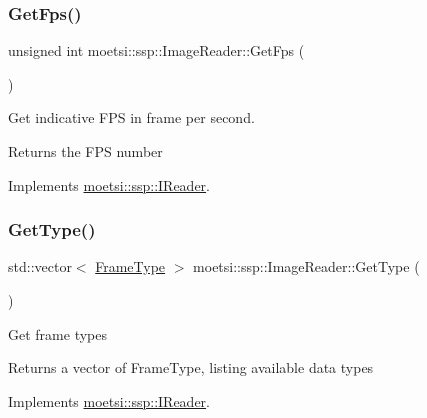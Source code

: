 \subsubsection{\texorpdfstring{Get\+Fps()}{GetFps()}}
{\footnotesize\ttfamily unsigned int moetsi\+::ssp\+::\+Image\+Reader\+::\+Get\+Fps (\begin{DoxyParamCaption}{ }\end{DoxyParamCaption})\hspace{0.3cm}{\ttfamily [virtual]}}

Get indicative F\+PS in frame per second. \begin{DoxyReturn}{Returns}
the F\+PS number 
\end{DoxyReturn}


Implements \hyperlink{classmoetsi_1_1ssp_1_1IReader_a9f6a8650ca290b011b8e5451eeae9f32}{moetsi\+::ssp\+::\+I\+Reader}.

\mbox{\label{classmoetsi_1_1ssp_1_1ImageReader_af6f66957b6e3268c5336f4176c77fc73}} 
\subsubsection{\texorpdfstring{Get\+Type()}{GetType()}}
{\footnotesize\ttfamily std\+::vector$<$ \hyperlink{namespacemoetsi_1_1ssp_a46efdfa2cd5a28ead465dcc8006b5a87}{Frame\+Type} $>$ moetsi\+::ssp\+::\+Image\+Reader\+::\+Get\+Type (\begin{DoxyParamCaption}{ }\end{DoxyParamCaption})\hspace{0.3cm}{\ttfamily [virtual]}}

Get frame types \begin{DoxyReturn}{Returns}
a vector of Frame\+Type, listing available data types 
\end{DoxyReturn}


Implements \hyperlink{classmoetsi_1_1ssp_1_1IReader_a4116c1931fde7bd66133934ffdca1cce}{moetsi\+::ssp\+::\+I\+Reader}.

\mbox{\label{classmoetsi_1_1ssp_1_1ImageReader_a32eb88cc612e6920f4910e0803b0ce3c}} 

